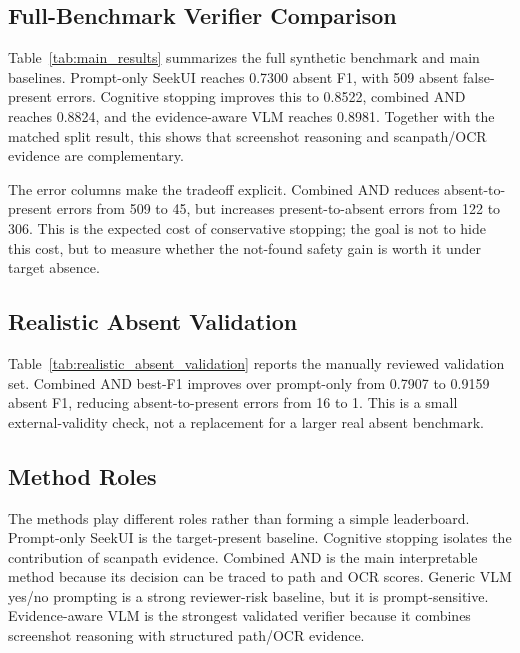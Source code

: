 

\subsection{Full-Benchmark Verifier Comparison}

Table~\ref{tab:main_results} summarizes the full synthetic benchmark and main baselines. Prompt-only SeekUI reaches 0.7300 absent F1, with 509 absent false-present errors. Cognitive stopping improves this to 0.8522, combined AND reaches 0.8824, and the evidence-aware VLM reaches 0.8981. Together with the matched split result, this shows that screenshot reasoning and scanpath/OCR evidence are complementary.

The error columns make the tradeoff explicit. Combined AND reduces absent-to-present errors from 509 to 45, but increases present-to-absent errors from 122 to 306. This is the expected cost of conservative stopping; the goal is not to hide this cost, but to measure whether the not-found safety gain is worth it under target absence.



\subsection{Realistic Absent Validation}

Table~\ref{tab:realistic_absent_validation} reports the manually reviewed validation set. Combined AND best-F1 improves over prompt-only from 0.7907 to 0.9159 absent F1, reducing absent-to-present errors from 16 to 1. This is a small external-validity check, not a replacement for a larger real absent benchmark.



\subsection{Method Roles}

The methods play different roles rather than forming a simple leaderboard. Prompt-only SeekUI is the target-present baseline. Cognitive stopping isolates the contribution of scanpath evidence. Combined AND is the main interpretable method because its decision can be traced to path and OCR scores. Generic VLM yes/no prompting is a strong reviewer-risk baseline, but it is prompt-sensitive. Evidence-aware VLM is the strongest validated verifier because it combines screenshot reasoning with structured path/OCR evidence.

